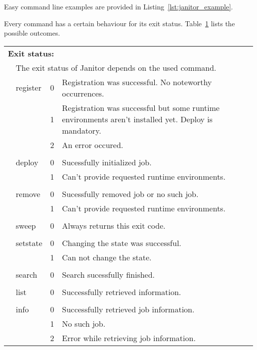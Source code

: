 Easy command line examples are provided in Listing~\ref{lst:janitor_example}.

Every command has a certain behaviour for its exit status.
Table~\ref{tab:janitor_commandline_exit_status} lists the possible outcomes.

\begin{table}[!h]
   \begin{center}
        \label{tab:janitor_commandline_exit_status}
	\begin{tabular}{p{0.5cm}p{2cm}p{0.5cm}p{11cm}}
	\multicolumn{3}{l}{\textbf{Exit status:}} \\
	&\multicolumn{3}{l}{The exit status of Janitor depends on the used command.} \\
	&	register			& 0 & Registration was successful. No noteworthy occurrences.\\
	&					& 1 & Registration was successful but some runtime environments aren't installed yet. Deploy is mandatory.\\ 
	&					& 2 & An error occured.\\
	&					&   &\\
	&	deploy				& 0 & Sucessfully initialized job.\\
	&					& 1 & Can't provide requested runtime environments.\\ 
	&					&   &\\
	&	remove				& 0 & Sucessfully removed job or no such job.\\
	&					& 1 & Can't provide requested runtime environments.\\ 
	&					&   &\\
	&	sweep				& 0 & Always returns this exit code.\\
	&					&   &\\
	&	setstate			& 0 & Changing the state was successful.\\
	&					& 1 & Can not change the state.\\ 
	&					&   &\\
	&	search				& 0 & Search sucessfully finished.\\
	&					&   &\\
	&	list				& 0 & Successfully retrieved information.\\
	&					&   &\\
	&	info				& 0 & Successfully retrieved job information.\\
	&					& 1 & No such job.\\ 
	&					& 2 & Error while retrieving job information.\\
	\end{tabular} 
   \end{center}
\end{table}


